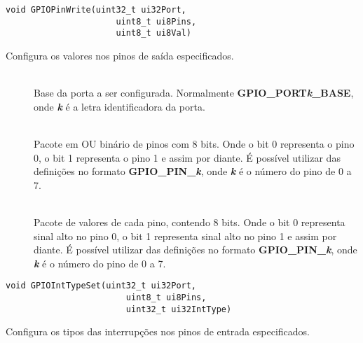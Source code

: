 \begin{lstlisting}[style=funcao]
	void GPIOPinWrite(uint32_t ui32Port,
					  uint8_t ui8Pins,
					  uint8_t ui8Val)
\end{lstlisting}

Configura os valores nos pinos de saída especificados.

\begin{description}
	\item []\hfill \\
	Base da porta a ser configurada. Normalmente \textbf{GPIO\_PORT\emph{k}\_BASE}, onde \textbf{\emph{k}} é a letra identificadora da porta.
	
	\item []\hfill \\
	Pacote em OU binário de pinos com 8 bits. Onde o bit 0 representa o pino 0, o bit 1 representa o pino 1 e assim por diante. É possível utilizar das definições no formato  \textbf{GPIO\_PIN\_\emph{k}}, onde \textbf{\emph{k}} é o número do pino de 0 a 7.
	
	\item []\hfill \\
	Pacote de valores de cada pino, contendo 8 bits. Onde o bit 0 representa sinal alto no pino 0, o bit 1 representa sinal alto no pino 1 e assim por diante. É possível utilizar das definições no formato  \textbf{GPIO\_PIN\_\emph{k}}, onde \textbf{\emph{k}} é o número do pino de 0 a 7.
\end{description}

\begin{lstlisting}[style=funcao]
	void GPIOIntTypeSet(uint32_t ui32Port,
						uint8_t ui8Pins,
						uint32_t ui32IntType)
\end{lstlisting}

Configura os tipos das interrupções nos pinos de entrada especificados.

